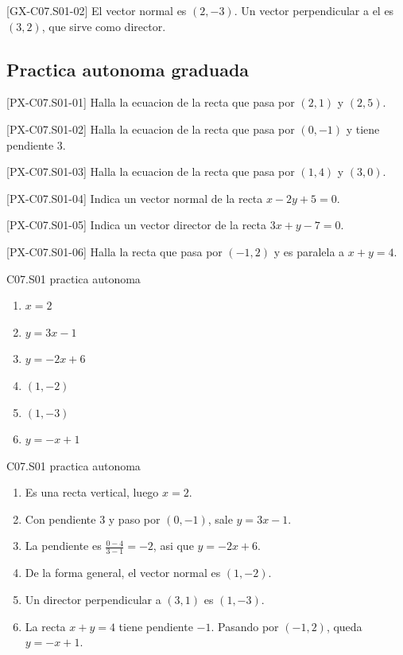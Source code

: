 \begin{fullsolution}{[GX-C07.S01-02]}
El vector normal es \((2,-3)\). Un vector perpendicular a el es \((3,2)\), que sirve como
director.
\end{fullsolution}

\subsection*{Practica autonoma graduada}
\begin{exercise}{[PX-C07.S01-01] Halla la ecuacion de la recta que pasa por \((2,1)\) y \((2,5)\).}
\end{exercise}
\begin{exercise}{[PX-C07.S01-02] Halla la ecuacion de la recta que pasa por \((0,-1)\) y tiene pendiente \(3\).}
\end{exercise}
\begin{exercise}{[PX-C07.S01-03] Halla la ecuacion de la recta que pasa por \((1,4)\) y \((3,0)\).}
\end{exercise}
\begin{exercise}{[PX-C07.S01-04] Indica un vector normal de la recta \(x-2y+5=0\).}
\end{exercise}
\begin{exercise}{[PX-C07.S01-05] Indica un vector director de la recta \(3x+y-7=0\).}
\end{exercise}
\begin{exercise}{[PX-C07.S01-06] Halla la recta que pasa por \((-1,2)\) y es paralela a \(x+y=4\).}
\end{exercise}

\begin{shortanswer}{C07.S01 practica autonoma}
\begin{enumerate}[label=\textbf{PX-C07.S01-\arabic*:}, leftmargin=*]
  \item \(x=2\)
  \item \(y=3x-1\)
  \item \(y=-2x+6\)
  \item \((1,-2)\)
  \item \((1,-3)\)
  \item \(y=-x+1\)
\end{enumerate}
\end{shortanswer}

\begin{fullsolution}{C07.S01 practica autonoma}
\begin{enumerate}[label=\textbf{PX-C07.S01-\arabic*:}, leftmargin=*]
  \item Es una recta vertical, luego \(x=2\).
  \item Con pendiente \(3\) y paso por \((0,-1)\), sale \(y=3x-1\).
  \item La pendiente es \(\frac{0-4}{3-1}=-2\), asi que \(y=-2x+6\).
  \item De la forma general, el vector normal es \((1,-2)\).
  \item Un director perpendicular a \((3,1)\) es \((1,-3)\).
  \item La recta \(x+y=4\) tiene pendiente \(-1\). Pasando por \((-1,2)\), queda \(y=-x+1\).
\end{enumerate}
\end{fullsolution}

